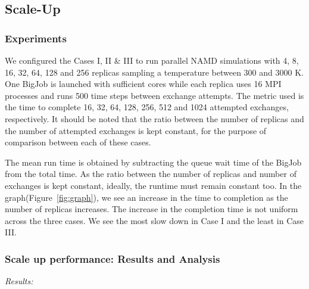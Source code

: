 \documentclass[a4paper,10pt]{article}
\begin{document}

\subsection{Scale-Up}

\subsubsection{Experiments}
We configured the Cases I, II \& III to run parallel NAMD simulations with 4, 8, 16, 32, 64, 128 and 256 replicas sampling a temperature between 300 and 3000 K. One BigJob is launched with sufficient cores while each replica uses 16 MPI processes and runs 500 time steps between exchange attempts. The metric used is the time to complete 16, 32, 64, 128, 256, 512 and 1024 attempted exchanges, respectively. It should be noted that the ratio between the number of replicas and the number of attempted exchanges is kept constant, for the purpose of comparison between each of these cases.  %

The mean run time is obtained by subtracting the queue wait time of the BigJob from the total time. As the ratio between the number of replicas and number of exchanges is kept constant, ideally, the runtime must remain constant too. In the graph(Figure~\ref{fig:graph}), we see an increase in the time to completion as the number of replicas increases. The increase in the completion time is not uniform across the three cases. We see the most slow down in Case I and the least in Case III.

\subsubsection{Scale up performance: Results and Analysis}

{\it Results:}\\
\end{document}
